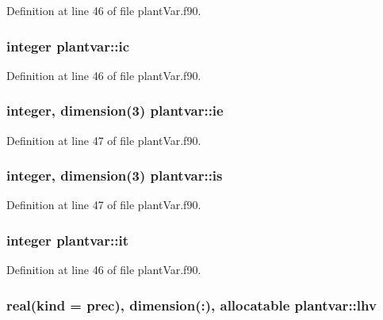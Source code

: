 Definition at line 46 of file plant\-Var.\-f90.

\hypertarget{classplantvar_ad912cbd511b056bee83744eefe0c0ef8}{
\subsubsection[{ic}]{\setlength{\rightskip}{0pt plus 5cm}integer plantvar\-::ic}}\label{classplantvar_ad912cbd511b056bee83744eefe0c0ef8}


Definition at line 46 of file plant\-Var.\-f90.

\hypertarget{classplantvar_a9a1a47dc2865d900ce5834934d4c6c06}{
\subsubsection[{ie}]{\setlength{\rightskip}{0pt plus 5cm}integer, dimension(3) plantvar\-::ie}}\label{classplantvar_a9a1a47dc2865d900ce5834934d4c6c06}


Definition at line 47 of file plant\-Var.\-f90.

\hypertarget{classplantvar_add18a489fead102059c74cf8875f94e0}{
\subsubsection[{is}]{\setlength{\rightskip}{0pt plus 5cm}integer, dimension(3) plantvar\-::is}}\label{classplantvar_add18a489fead102059c74cf8875f94e0}


Definition at line 47 of file plant\-Var.\-f90.

\hypertarget{classplantvar_a05f1670af399c966c49b07aa825f279e}{
\subsubsection[{it}]{\setlength{\rightskip}{0pt plus 5cm}integer plantvar\-::it}}\label{classplantvar_a05f1670af399c966c49b07aa825f279e}


Definition at line 46 of file plant\-Var.\-f90.

\hypertarget{classplantvar_a8c41db489c4d6b494849ab3c82833e29}{
\subsubsection[{lhv}]{\setlength{\rightskip}{0pt plus 5cm}real(kind = prec), dimension(\-:), allocatable plantvar\-::lhv}}\label{classplantvar_a8c41db489c4d6b494849ab3c82833e29}


